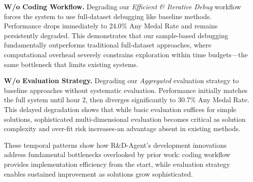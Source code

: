 \textbf{W/o Coding Workflow.} Degrading our \textit{Efficient \& Iterative Debug} workflow forces the system to use full-dataset debugging like baseline methods. Performance drops immediately to 24.0\% Any Medal Rate and remains persistently degraded. This demonstrates that our sample-based debugging fundamentally outperforms traditional full-dataset approaches, where computational overhead severely constrains exploration within time budgets—the same bottleneck that limits existing systems.

\textbf{W/o Evaluation Strategy.} Degrading our \textit{Aggregated} evaluation strategy to baseline approaches without systematic evaluation. Performance initially matches the full system until hour 2, then diverges significantly to 30.7\% Any Medal Rate. This delayed degradation shows that while basic evaluation suffices for simple solutions, sophisticated multi-dimensional evaluation becomes critical as solution complexity and over-fit risk increases-an advantage absent in existing methods.

These temporal patterns show how R\&D-Agent's development innovations address fundamental bottlenecks overlooked by prior work: coding workflow provides implementation efficiency from the start, while evaluation strategy enables sustained improvement as solutions grow sophisticated.



